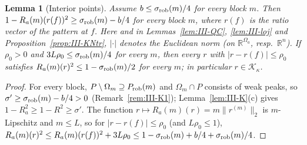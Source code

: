 \documentclass[10pt]{amsart}
\newtheorem{lemma}[theorem]{Lemma}
\theoremstyle{definition}
\theoremstyle{remark}
\newcommand{\R}{\mathbb R}
\begin{document}
\begin{lemma}[Interior points]\label{lem:III-interior}
Assume $b\le\sigma_{\rm rob}(m)/4$ for every block $m$.  Then $1-R_a(m)(r(f))^2
\ge\sigma_{\rm rob}(m)-b/4$ for every block $m$, where $r(f)$ is the ratio vector
of the pattern at $f$.  Here and in Lemmas~\ref{lem:III-QC}, \ref{lem:III-loj}
and Proposition~\ref{prop:III-KNtr}, $|\cdot|$ denotes the Euclidean norm (on
$\R^{\Omega_a}$, resp.\ $\R^n$).  If $\rho_0>0$ and $3L\rho_0\le\sigma_{\rm rob}(m)/4$ for
every $m$, then every $r$ with $|r-r(f)|\le\rho_0$ satisfies $R_a(m)(r)^2\le
1-\sigma_{\rm rob}(m)/2$ for every $m$; in particular $r\in\mathcal K_\kappa$.
\end{lemma}

\begin{proof}
For every block, $P\setminus\Omega_m\supseteq P_{\rm rob}(m)$ and $\Omega_m\cap P$
consists of weak peaks, so $\sigma'\ge\sigma_{\rm rob}(m)-b/4>0$
(Remark~\ref{rem:III-K1}); Lemma~\ref{lem:III-K}(c) gives $1-R_a^2\ge1-R^2\ge
\sigma'$.  The function $r\mapsto R_a(m)(r)=m\|r^{(m)}\|_2$ is $m$-Lipschitz and
$m\le L$, so for $|r-r(f)|\le\rho_0$ (and $L\rho_0\le1$), $R_a(m)(r)^2\le
R_a(m)(r(f))^2+3L\rho_0\le1-\sigma_{\rm rob}(m)+b/4+\sigma_{\rm rob}(m)/4$.
\end{proof}
\end{document}

